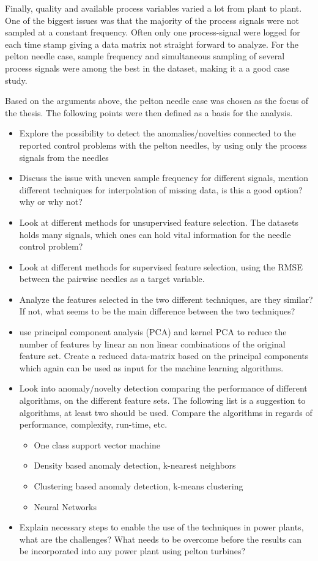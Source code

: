 Finally, quality and available process variables varied a lot from plant to plant. One of the biggest issues was that the majority of the process signals were not sampled at a constant frequency. Often only one process-signal were logged for each time stamp giving a data matrix not straight forward to analyze. For the pelton needle case, sample frequency and simultaneous sampling of several process signals were among the best in the dataset, making it a a good case study.  


Based on the arguments above, the pelton needle case was chosen as the focus of the thesis. The following points were then defined as a basis for the analysis. 

\begin{itemize}
    \item Explore the possibility to detect the anomalies/novelties connected to the reported control problems with the pelton needles, by using only the process signals from the needles  
    \item Discuss the issue with uneven sample frequency for different signals, mention different techniques for interpolation of missing data, is this a good option? why or why not? 
    \item Look at different methods for unsupervised feature selection. The datasets holds many signals, which ones can hold vital information for the needle control problem? 
    \item Look at different methods for supervised feature selection, using the RMSE between the pairwise needles as a target variable. 
    \item Analyze the features selected in the two different techniques, are they similar? If not, what seems to be the main difference between the two techniques? 
    \item use principal component analysis (PCA) and kernel PCA to reduce the number of features by linear an non linear combinations of the original feature set. Create a reduced data-matrix based on the principal components which again can be used as input for the machine learning algorithms. 
    \item Look into anomaly/novelty detection comparing the performance of different algorithms, on the different feature sets. The following list is a suggestion to algorithms, at least two should be used. Compare the algorithms in regards of performance, complexity, run-time, etc. 
    \begin{itemize}
        \item One class support vector machine
        \item Density based anomaly detection, k-nearest neighbors
        \item Clustering based anomaly detection, k-means clustering 
        \item Neural Networks 
    \end{itemize}
    \item Explain necessary steps to enable the use of the techniques in power plants, what are the challenges? What needs to be overcome before the results can be incorporated into any power plant using pelton turbines?     
    
\end{itemize}
